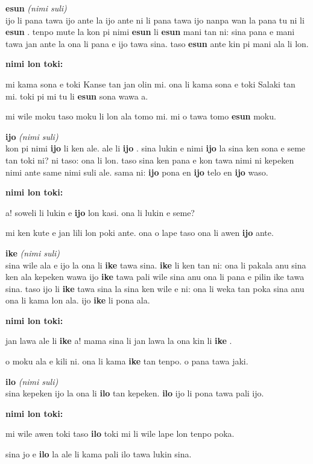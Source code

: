 \documentclass[a4paper,11pt]{book}
\newenvironment{definition}[2]{ %
  \begin{minipage}{\dimexpr\textwidth}
  \begin{description}
  \item
    {\huge \textbf{#1}}
    {\Large \textit{(#2)}} \\
}{
  \end{description}
  \end{minipage}
}
\newenvironment{example}{ %
  \item
  \textbf{nimi lon toki:}

  \hfill
  \begin{minipage}{\dimexpr\textwidth-1cm}
  \begin{itshape}
}
{
  \end{itshape}
  \end{minipage}
}
\newcommand{\inex}[1]{%
  \textbf{#1}%
}
\begin{document}
\begin{definition}{esun}{nimi suli}
  ijo li pana tawa ijo ante la ijo ante ni li pana tawa ijo nanpa wan la pana tu ni li \inex{esun}. tenpo mute la kon pi nimi \inex{esun} li \inex{esun} mani tan ni: sina pana e mani tawa jan ante la ona li pana e ijo tawa sina. taso \inex{esun} ante kin pi mani ala li lon.
  \begin{example}
    mi kama sona e toki Kanse tan jan olin mi. ona li kama sona e toki Salaki tan mi. toki pi mi tu li \inex{esun} sona wawa a.
    
    mi wile moku taso moku li lon ala tomo mi. mi o tawa tomo \inex{esun} moku.
  \end{example}
\end{definition}

\begin{definition}{ijo}{nimi suli}
  kon pi nimi \inex{ijo} li ken ale. ale li \inex{ijo}. sina lukin e nimi \inex{ijo} la sina ken sona e seme tan toki ni? ni taso: ona li lon. taso sina ken pana e kon tawa nimi ni kepeken nimi ante same nimi suli ale. sama ni: \inex{ijo} pona en \inex{ijo} telo en \inex{ijo} waso.
  \begin{example}
    a! soweli li lukin e \inex{ijo} lon kasi. ona li lukin e seme?
    
    mi ken kute e jan lili lon poki ante. ona o lape taso ona li awen \inex{ijo} ante.
  \end{example}
\end{definition}

\begin{definition}{ike}{nimi suli}
  sina wile ala e ijo la ona li \inex{ike} tawa sina. \inex{ike} li ken tan ni: ona li pakala anu sina ken ala kepeken wawa ijo \inex{ike} tawa pali wile sina anu ona li pana e pilin ike tawa sina. taso ijo li \inex{ike} tawa sina la sina ken wile e ni: ona li weka tan poka sina anu ona li kama lon ala. ijo \inex{ike} li pona ala.
  \begin{example}
    jan lawa ale li \inex{ike} a! mama sina li jan lawa la ona kin li \inex{ike}.
    
    o moku ala e kili ni. ona li kama \inex{ike} tan tenpo. o pana tawa jaki.
  \end{example}
\end{definition}

\begin{definition}{ilo}{nimi suli}
  sina kepeken ijo la ona li \inex{ilo} tan kepeken. \inex{ilo} ijo li pona tawa pali ijo.
  \begin{example}
    mi wile awen toki taso \inex{ilo} toki mi li wile lape lon tenpo poka.
    
    sina jo e \inex{ilo} la ale li kama pali ilo tawa lukin sina.
  \end{example}
\end{definition}
\end{document}
